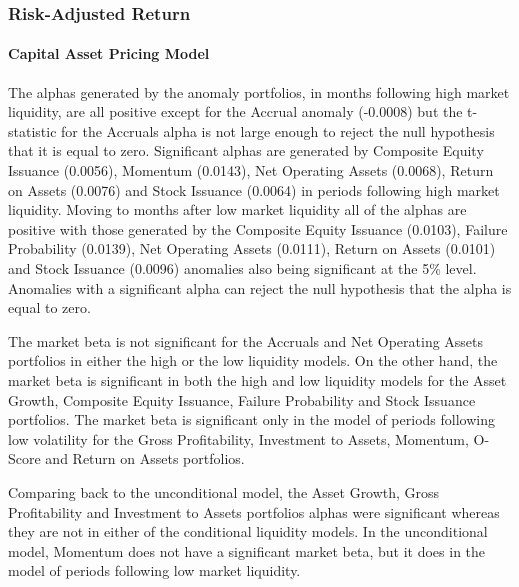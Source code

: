 \documentclass[a4paper]{article}                 %
\begin{document}
\subsubsection{Risk-Adjusted Return}
\paragraph{Capital Asset Pricing Model}
The alphas generated by the anomaly portfolios, in months following high market liquidity, are all positive except for the Accrual anomaly (-0.0008) but the t-statistic for the Accruals alpha is not large enough to reject the null hypothesis that it is equal to zero. Significant alphas are generated by Composite Equity Issuance (0.0056), Momentum (0.0143), Net Operating Assets (0.0068), Return on Assets (0.0076) and Stock Issuance (0.0064) in periods following high market liquidity. Moving to months after low market liquidity all of the alphas are positive with those generated by the Composite Equity Issuance (0.0103), Failure Probability (0.0139), Net Operating Assets (0.0111), Return on Assets (0.0101) and Stock Issuance (0.0096) anomalies also being significant at the 5\% level. Anomalies with a significant alpha can reject the null hypothesis that the alpha is equal to zero.

The market beta is not significant for the Accruals and Net Operating Assets portfolios in either the high or the low liquidity models. On the other hand, the market beta is significant in both the high and low liquidity models for the Asset Growth, Composite Equity Issuance, Failure Probability and Stock Issuance portfolios. The market beta is significant only in the model of periods following low volatility for the Gross Profitability, Investment to Assets, Momentum, O-Score and Return on Assets portfolios.

Comparing back to the unconditional model, the Asset Growth, Gross Profitability and Investment to Assets portfolios alphas were significant whereas they are not in either of the conditional liquidity models. In the unconditional model, Momentum does not have a significant market beta, but it does in the model of periods following low market liquidity. 
\end{document}
